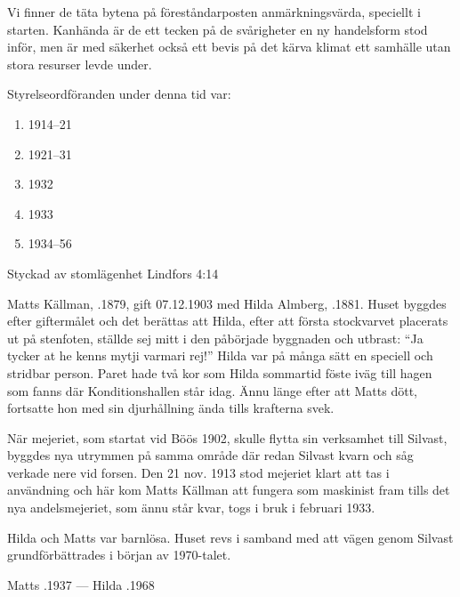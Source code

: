 Vi finner de täta bytena på föreståndarposten anmärkningsvärda, speciellt i starten. Kanhända är de ett tecken på de svårigheter en ny handelsform stod inför, men är med säkerhet också ett bevis på det kärva klimat ett samhälle utan stora resurser levde under.

Styrelseordföranden under denna tid var:
\begin{enumerate}
  \item {}     1914--21
  \item {}      1921--31
  \item {}   1932
  \item {}  1933
  \item {}  1934--56
\end{enumerate}




Styckad av stomlägenhet Lindfors 4:14

Matts Källman, .1879, gift 07.12.1903 med Hilda Almberg, .1881. Huset byggdes efter giftermålet och det berättas att Hilda, efter att första stockvarvet placerats ut på stenfoten, ställde sej mitt i den påbörjade byggnaden och utbrast: ``Ja tycker at he kenns mytji varmari rej!'' Hilda var på många sätt en speciell och stridbar person. Paret hade två kor som Hilda sommartid föste iväg till hagen som fanns där Konditionshallen står idag. Ännu länge efter att Matts dött, fortsatte hon med sin djurhållning ända tills krafterna svek.

När mejeriet, som startat vid Böös 1902, skulle flytta sin verksamhet till Silvast, byggdes nya utrymmen på samma område där redan Silvast kvarn och såg verkade nere vid forsen. Den 21 nov. 1913 stod mejeriet klart att tas i användning och här kom Matts Källman att fungera som maskinist fram tills det nya andelsmejeriet, som ännu står kvar, togs i bruk i februari 1933.

Hilda och Matts var barnlösa. Huset revs i samband med att vägen genom Silvast grundförbättrades i början av 1970-talet.

Matts .1937  ---  Hilda .1968





